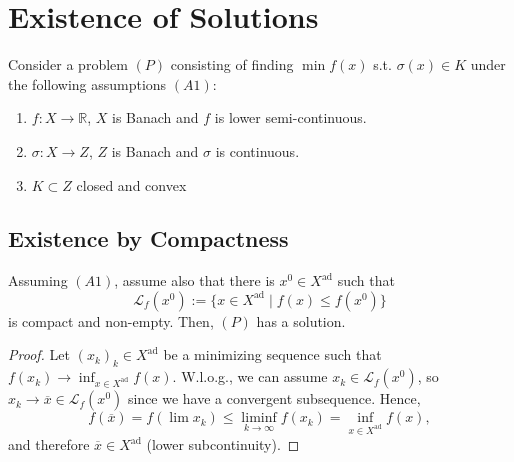 \section{Existence of Solutions}
Consider a problem $(P)$ consisting of finding $\min f(x)$ s.t. $\sigma(x) \in K$ under the following assumptions $(A1)$:
\begin{enumerate}
    \item $f: X \to \mathbb{R}$, $X$ is Banach and $f$ is lower semi-continuous.
    \item $\sigma: X \to Z$, $Z$ is Banach and $\sigma$ is continuous.
    \item $K \subset Z$ closed and convex
\end{enumerate}
\subsection*{Existence by Compactness}
\begin{theorem}
    Assuming $(A1)$, assume also that there is $x^0 \in X^\text{ad}$ such that \[
        \mathscr{L}_f(x^0) := \{x \in X^\text{ad} \mid f(x) \leq f(x^0)\} 
    \] is compact and non-empty. Then, $(P)$ has a solution. 
\end{theorem}
\begin{proof}
    Let $(x_k)_k \in X^\text{ad}$ be a minimizing sequence such that $f(x_k) \to \inf_{x \in X^\text{ad}} f(x)$. W.l.o.g., we can assume $x_k \in \mathscr{L}_f(x^0)$, so $x_k \to \overline{x} \in \mathscr{L}_f(x^0)$ since we have a convergent subsequence. Hence,
    \[
        f(\overline{x}) = f(\lim x_k) \leq \liminf_{k \to \infty} f(x_k) = \inf_{x \in X^\text{ad}} f(x)
    ,\] and therefore $\overline{x} \in X^\text{ad}$ (lower subcontinuity).
\end{proof}
